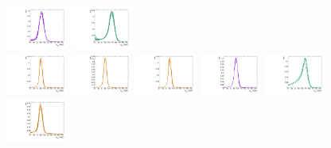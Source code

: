 \begin{figure}[htbp]
  \includegraphics[width=0.18\textwidth]{fig/analysisAppendix/templateSignalVsMX_fromDC_WprToWZ_MJJ_mu_LP_bb_HDy.pdf}
  \includegraphics[width=0.18\textwidth]{fig/analysisAppendix/templateSignalVsMX_fromDC_WprToWH_MJJ_mu_LP_bb_HDy.pdf}\\
  \includegraphics[width=0.18\textwidth]{fig/analysisAppendix/templateSignalVsMX_fromDC_GbuToWW_MJJ_mu_HP_nobb_HDy.pdf}
  \includegraphics[width=0.18\textwidth]{fig/analysisAppendix/templateSignalVsMX_fromDC_RadToWW_MJJ_mu_HP_nobb_HDy.pdf}
  \includegraphics[width=0.18\textwidth]{fig/analysisAppendix/templateSignalVsMX_fromDC_ZprToWW_MJJ_mu_HP_nobb_HDy.pdf}
  \includegraphics[width=0.18\textwidth]{fig/analysisAppendix/templateSignalVsMX_fromDC_WprToWZ_MJJ_mu_HP_nobb_HDy.pdf}
  \includegraphics[width=0.18\textwidth]{fig/analysisAppendix/templateSignalVsMX_fromDC_WprToWH_MJJ_mu_HP_nobb_HDy.pdf}\\
  \includegraphics[width=0.18\textwidth]{fig/analysisAppendix/templateSignalVsMX_fromDC_GbuToWW_MJJ_mu_LP_nobb_HDy.pdf}

\end{figure}
